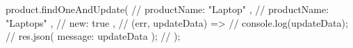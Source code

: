 product.findOneAndUpdate(
    // { productName: "Laptop" },
    // { productName: "Laptops" },
    // { new: true },
    // (err, updateData) => {
    //   console.log(updateData);
    //   res.json({ message: updateData });
    // }
  );